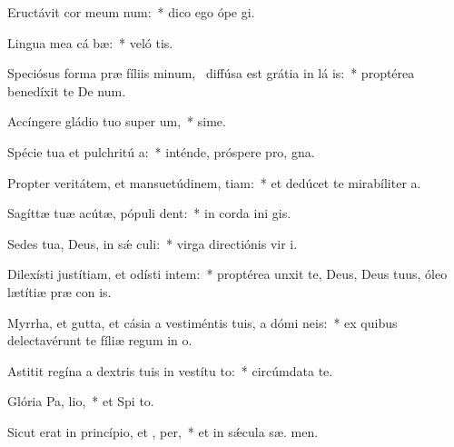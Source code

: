 \item Eructávit cor meum  num:~* dico ego ópe  gi.
\item Lingua mea cá bæ:~* veló tis.
\item Speciósus forma præ fíliis minum,~\pscross{} diffúsa est grátia in lá is:~* proptérea benedíxit te De  num.
\item Accíngere gládio tuo super  um,~* sime.
\item Spécie tua et pulchritú a:~* inténde, próspere pro,  gna.
\item Propter veritátem, et mansuetúdinem,  tiam:~* et dedúcet te mirabíliter  a.
\item Sagíttæ tuæ acútæ, pópuli   dent:~* in corda ini gis.
\item Sedes tua, Deus, in sǽ culi:~* virga directiónis vir  i.
\item Dilexísti justítiam, et odísti intem:~* proptérea unxit te, Deus, Deus tuus, óleo lætítiæ præ con is.
\item Myrrha, et gutta, et cásia a vestiméntis tuis, a dómi neis:~* ex quibus delectavérunt te fíliæ regum in  o.
\item Astitit regína a dextris tuis in vestítu to:~* circúmdata te.
\item Glória Pa,  lio,~* et Spi to.
\item Sicut erat in princípio, et ,  per,~* et in sǽcula sæ. men.
